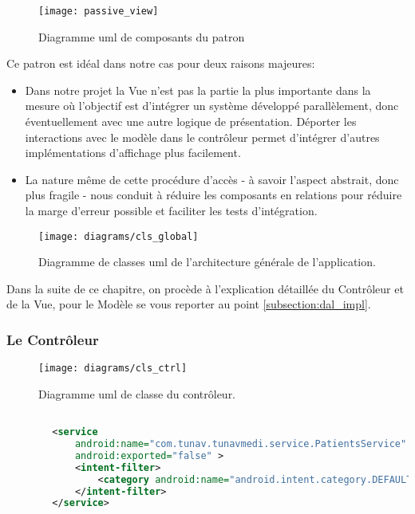 \begin{figure}
\center
\texttt{[image: passive\_view]}
\caption{Diagramme \gls{uml} de composants du patron ~\cite{fowler:passive_view}}
\label{fig:passive_view}
\end{figure}

Ce patron est idéal dans notre cas pour deux raisons majeures:

\begin{itemize} 

\item Dans notre projet la Vue n'est pas la partie la plus importante
dans la mesure où l'objectif est d'intégrer un système développé
parallèlement, donc éventuellement avec une autre logique de
présentation. Déporter les interactions avec le modèle dans le
contrôleur permet d'intégrer d'autres implémentations d'affichage plus
facilement.

\item La nature même de cette procédure d’accès - à savoir l’aspect
abstrait, donc plus fragile - nous conduit à réduire les composants en
relations pour réduire la marge d'erreur possible et faciliter les tests d’intégration.

\end{itemize}

\begin{figure}
\center
\texttt{[image: diagrams/cls\_global]}
\caption{Diagramme de classes \gls{uml} de l'architecture générale de l'application.}
\label{fig:cls_global}
\end{figure}

Dans la suite de ce chapitre, on procède à l'explication détaillée du Contrôleur
et de la Vue, pour le Modèle se vous reporter au point
\ref{subsection:dal_impl}.

\subsubsection{Le Contrôleur}

\begin{figure}
\center
\texttt{[image: diagrams/cls\_ctrl]}
\caption{Diagramme \gls{uml} de classe du contrôleur.}
\label{fig:cls_ctrl}
\end{figure}

\begin{lstlisting}[language=xml, caption=Déclaration dans AndroidManifest du PatientService]

        <service
            android:name="com.tunav.tunavmedi.service.PatientsService"
            android:exported="false" >
            <intent-filter>
                <category android:name="android.intent.category.DEFAULT" />
            </intent-filter>
        </service>

\end{lstlisting}

